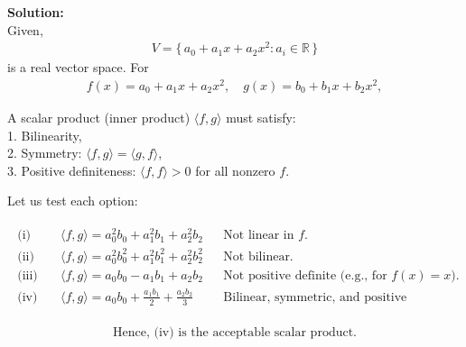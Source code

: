 \documentclass[journal]{IEEEtran}
\begin{document}
\textbf{Solution:} \\ 
Given,
\begin{align}
    V = \{\, a_0 + a_1x + a_2x^2 : a_i \in \mathbb{R} \,\}
\end{align}
is a real vector space. For
\begin{align}
f(x) = a_0 + a_1x + a_2x^2, \quad g(x) = b_0 + b_1x + b_2x^2,
\end{align}


A scalar product (inner product) $\langle f,g\rangle$ must satisfy: \\ 
1. Bilinearity, \\ 
2. Symmetry: $\langle f,g\rangle = \langle g,f\rangle$, \\ 
3. Positive definiteness: $\langle f,f\rangle > 0$ for all nonzero $f$.

Let us test each option:

\begin{align}
\begin{aligned}
\text{(i)} \quad & \langle f,g\rangle = a_0^2b_0 + a_1^2b_1 + a_2^2b_2 
&& \text{Not linear in } f. \\
\text{(ii)} \quad & \langle f,g\rangle = a_0^2b_0^2 + a_1^2b_1^2 + a_2^2b_2^2
&& \text{Not bilinear.} \\
\text{(iii)} \quad & \langle f,g\rangle = a_0b_0 - a_1b_1 + a_2b_2
&& \text{Not positive definite (e.g., for } f(x)=x). \\
\text{(iv)} \quad & \langle f,g\rangle = a_0b_0 + \frac{a_1b_1}{2} + \frac{a_2b_2}{3}
&& \text{Bilinear, symmetric, and positive definite.}
\end{aligned}
\end{align}

\begin{align}
\boxed{\text{Hence, (iv) is the acceptable scalar product.}}
\end{align}
\end{document}
